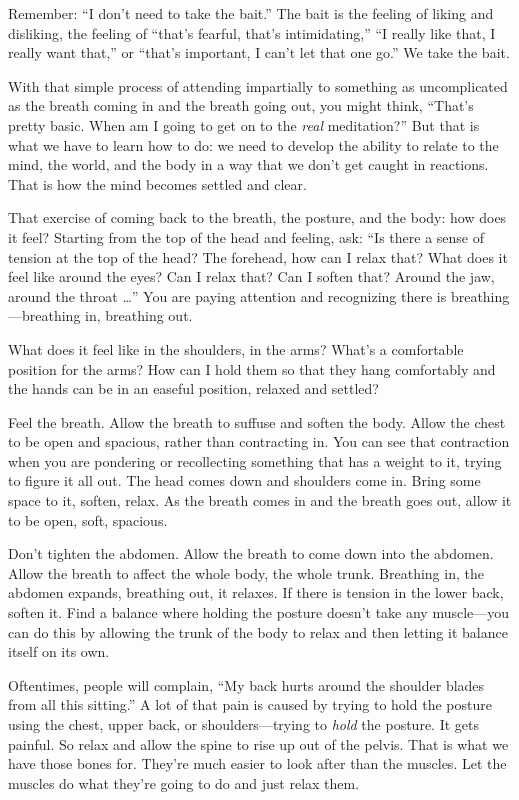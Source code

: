 Remember: “I don’t need to take the bait.” The bait is the feeling of
liking and disliking, the feeling of “that’s fearful, that’s
intimidating,” “I really like that, I really want that,” or “that’s
important, I can’t let that one go.” We take the bait.

With that simple process of attending impartially to something as
uncomplicated as the breath coming in and the breath going out, you
might think, “That’s pretty basic. When am I going to get on to the
\emph{real} meditation?” But that is what we have to learn how to do: we
need to develop the ability to relate to the mind, the world, and the
body in a way that we don’t get caught in reactions. That is how the
mind becomes settled and clear.

That exercise of coming back to the breath, the posture, and the body:
how does it feel? Starting from the top of the head and feeling, ask:
“Is there a sense of tension at the top of the head? The forehead, how
can I relax that? What does it feel like around the eyes? Can I relax
that? Can I soften that? Around the jaw, around the throat \ldots{}” You are
paying attention and recognizing there is breathing—breathing in,
breathing out.

What does it feel like in the shoulders, in the arms? What’s a
comfortable position for the arms? How can I hold them so that they hang
comfortably and the hands can be in an easeful position, relaxed and
settled?

Feel the breath. Allow the breath to suffuse and soften the body. Allow
the chest to be open and spacious, rather than contracting in. You can
see that contraction when you are pondering or recollecting something
that has a weight to it, trying to figure it all out. The head comes
down and shoulders come in. Bring some space to it, soften, relax. As
the breath comes in and the breath goes out, allow it to be open, soft,
spacious.

Don’t tighten the abdomen. Allow the breath to come down into the
abdomen. Allow the breath to affect the whole body, the whole trunk.
Breathing in, the abdomen expands, breathing out, it relaxes. If there
is tension in the lower back, soften it. Find a balance where holding
the posture doesn’t take any muscle—you can do this by allowing the
trunk of the body to relax and then letting it balance itself on its
own.

Oftentimes, people will complain, “My back hurts around the shoulder
blades from all this sitting.” A lot of that pain is caused by trying to
hold the posture using the chest, upper back, or shoulders—trying to
\emph{hold} the posture. It gets painful. So relax and allow the spine
to rise up out of the pelvis. That is what we have those bones for.
They’re much easier to look after than the muscles. Let the muscles do
what they’re going to do and just relax them.

